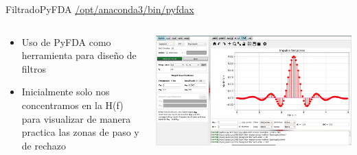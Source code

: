\begin{frame}[t]{Filtrado}{PyFDA \href{/opt/anaconda3/bin/pyfdax}{/opt/anaconda3/bin/pyfdax}}
   \begin{columns}[t]
      \footnotesize
      \begin{column}{.4\textwidth}
         \begin{itemize}
            \item{Uso de PyFDA como herramienta para diseño de filtros}
            \item{Inicialmente solo nos concentramos en la H(f) para visualizar de manera practica las zonas de paso y de rechazo}
         \end{itemize}
      \end{column}
      \hspace{2pt}
      \vrule
      \hspace{2pt}
      \begin{column}{.6\textwidth}
         \center\includegraphics[width=1.00\textwidth]{5_clase/pyfda1}
      \end{column}
      \hspace{2pt}
   \end{columns}
   \vfill
\end{frame}
